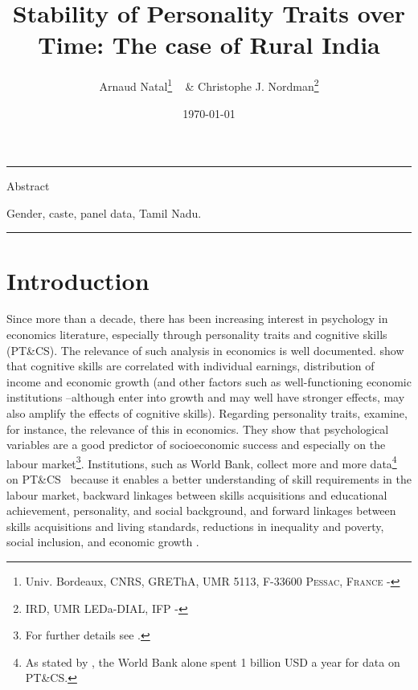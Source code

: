\documentclass[a4paper, 12pt, onecolumn]{article}
\title{Stability of Personality Traits over Time: The case of Rural India}
\author{Arnaud Natal\thanks{Univ. Bordeaux, CNRS, GREThA, UMR 5113, F-33600 \textsc{Pessac, France} - \email{arnaud.natal@u-bordeaux.fr}} ~ \& Christophe J. Nordman\thanks{IRD, UMR LEDa-DIAL, IFP - \email{nordman@dial.prd}} }
\date{\today}
\newcommand{\PTCS}{PT\&CS}
\begin{document}
\maketitle

\hrule 
\vspace{0.3cm}

\begin{resab}{Abstract}
\end{resab}

\begin{keywords}
Gender, caste, panel data, Tamil Nadu.
\end{keywords}

\begin{jelcodes}
\end{jelcodes}

\hrule

\clearpage
\newpage
\section{Introduction}
\label{Introduction}

Since more than a decade, there has been increasing interest in psychology in economics literature, especially through personality traits and cognitive skills (\PTCS).
The relevance of such analysis in economics is well documented.
\cite{Hanushek2008} show that cognitive skills are correlated with individual earnings, distribution of income and economic growth (and other factors such as well-functioning economic institutions --although enter into growth and may well have stronger effects, may also amplify the effects of cognitive skills).
Regarding personality traits, \cite{Borghans2008} examine, for instance, the relevance of this in economics.
They show that psychological variables are a good predictor of socioeconomic success and especially on the labour market\footnote{For further details see \cite{Almlund2011}.}. %
Institutions, such as World Bank, collect more and more data\footnote{As stated by \cite{Laajaj2019b}, the World Bank alone spent 1 billion USD a year for data on \PTCS.} on \PTCS~ because it enables a better understanding of skill requirements in the labour market, backward linkages between skills acquisitions and educational achievement, personality, and social background, and forward linkages between skills acquisitions and living standards, reductions in inequality and poverty, social inclusion, and economic growth \citep{STEP2014}.
\end{document}
